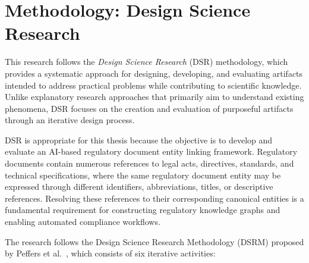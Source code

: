 \section{Methodology: Design Science Research}

This research follows the \textit{Design Science Research} (DSR) methodology,
which provides a systematic approach for designing, developing, and evaluating
artifacts intended to address practical problems while contributing to
scientific knowledge. Unlike explanatory research approaches that primarily
aim to understand existing phenomena, DSR focuses on the creation and
evaluation of purposeful artifacts through an iterative design process.

DSR is appropriate for this thesis because the objective is to develop and
evaluate an AI-based regulatory document entity linking framework. Regulatory documents
contain numerous references to legal acts, directives, standards, and technical
specifications, where the same regulatory document entity may be expressed through
different identifiers, abbreviations, titles, or descriptive references.
Resolving these references to their corresponding canonical entities is a
fundamental requirement for constructing regulatory knowledge graphs and
enabling automated compliance workflows.

The research follows the Design Science Research Methodology (DSRM) proposed
by Peffers et al.~\cite{peffers2007design}, which consists of six iterative
activities:

